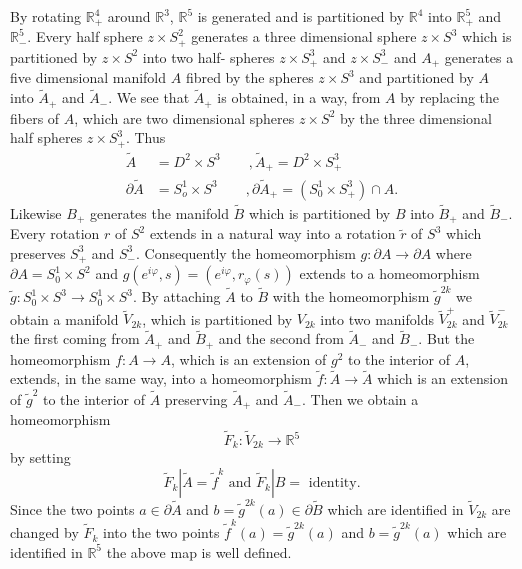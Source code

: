 By rotating $\mathbb{R}^{4}_+$ around $\mathbb{R}^{3}$,
$\mathbb{R}^{5}$ is generated and is partitioned by $\mathbb{R}^{4}$
into $\mathbb{R}^{5}_+$ and $\mathbb{R}^{5}_-$. Every half sphere $z
\times S^2_+$ generates a three dimensional sphere $z \times S^3$
which is  partitioned by $z \times S^2$ into two half- spheres $z
\times S^3_+$ and $z \times S^3_-$ and $A_+$ generates a five
dimensional manifold $A$ fibred by the spheres $z \times S^3$ and
partitioned by $A$ into $\tilde{A}_+$ and $\tilde{A}_-$. We see that
$\tilde{A}_+$ is  obtained, in a way, from $A$ by replacing the fibers
of $A$, which are two dimensional spheres $z \times S^2$ by the three
dimensional half spheres $z \times S^3_+$. Thus  
\begin{align*}
\tilde{A} &= D^2 \times S^3 \qquad, \tilde{A}_+ = D^2 \times S^3_+\\
\partial \tilde{A} & = S_o^1 \times S^3 \qquad, \partial \tilde{A}_+
= (S^1_0 \times S^3_+) \cap A. 
\end{align*}
Likewise $B_+$ generates the manifold $\tilde{B}$ which is partitioned
by $B$ into $\tilde{B}_+$ and $\tilde{B}_-$. Every rotation $r$ of
$S^2$ extends in a natural way into a rotation $\tilde{r}$ of $S^3$
which preserves $S_+^3$ and $S_-^3$. Consequently the homeomorphism $g
: \partial A \to \partial A$ where $\partial A = S^1_0
\times S^2$ and $g (e^{i \varphi}, s) = (e^{i \varphi}, r_{\varphi}
(s))$ extends to a homeomorphism $\tilde{g} : S^1_0 \times S^3 \to
S^1_0 \times S^3$. By attaching $\tilde{A}$ to $\tilde{B}$ with
the\pageoriginale 
homeomorphism $\tilde{g}^{2k}$ we obtain a manifold $\tilde{V}_{2k}$,
which is partitioned by $V_{2k}$ into two manifolds $\tilde{V}^+_{2k}$
and $\tilde{V}^-_{2k}$ the first coming from $\tilde{A}_+$ and
$\tilde{B}_+$ and the second from $\tilde{A}_-$ and $\tilde{B}_-$. But
the homeomorphism $f: A \to A$, which is an extension of $g^2$ to the
interior of $A$, extends, in the same way, into a homeomorphism
$\tilde{f} : \tilde{A} \to \tilde{A}$ which is an extension of
$\tilde{g}^2$ to the interior of $\tilde{A}$ preserving $\tilde{A}_+$
and $\tilde{A}_-$. Then we obtain a homeomorphism  
$$
\tilde{F}_k : \tilde{V}_{2k} \to \mathbb{R}^5 
$$
by setting 
$$
\tilde{F}_k | \tilde{A} = \tilde{f}^k \text{ and } \tilde{F}_k | B = \text{ 
  identity}. 
$$
Since the two points $a \in \partial \tilde{A}$ and $b =
\tilde{g}^{2k} (a) \in \partial \tilde{B}$ which are identified in
$\tilde{V}_{2k}$ are changed by $\tilde{F}_k$ into the two points
$\tilde{f}^k (a) = \tilde{g}^{2k} (a)$ and $b = \tilde{g}^{2k} (a)$
which are identified in $\mathbb{R}^5$ the above map is well
defined. 

